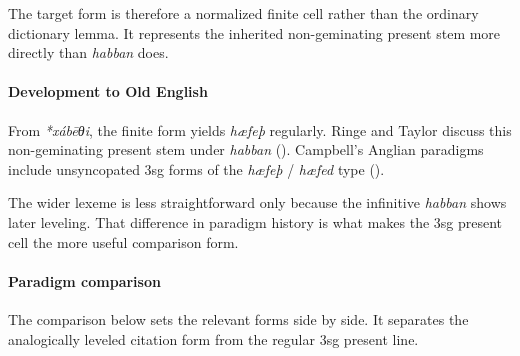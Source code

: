 \documentclass[
  british,
  a4paper,
]{article}
\begin{document}
The target form is therefore a normalized finite cell rather than the
ordinary dictionary lemma. It represents the inherited non-geminating
present stem more directly than \emph{habban} does.

\paragraph{Development to Old
English}\label{development-to-old-english-46}

From \emph{*xábēθi}, the finite form yields \emph{hæfeþ} regularly.
Ringe and Taylor discuss this non-geminating present stem under
\emph{habban} (). Campbell's Anglian paradigms include unsyncopated 3sg forms of
the \emph{hæfeþ} / \emph{hæfed} type
().

The wider lexeme is less straightforward only because the infinitive
\emph{habban} shows later leveling. That difference in paradigm history
is what makes the 3sg present cell the more useful comparison form.

\paragraph{Paradigm comparison}\label{paradigm-comparison-7}

The comparison below sets the relevant forms side by side. It separates
the analogically leveled citation form from the regular 3sg present
line.
\end{document}
